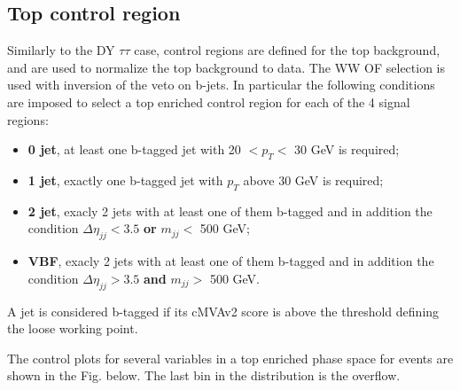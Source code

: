 \subsection{Top control region}
Similarly to the DY $\tau\tau$ case, control regions are defined for the top
background, and are used to normalize the top background to data.
The WW OF selection is used with inversion of the veto on b-jets. In
particular the following conditions are imposed to select a top enriched
control region for each of the 4 signal regions:
\begin{itemize}
\item {\bf 0 jet}, at least one b-tagged jet with 20 $< p_T <$ 30 GeV is required;
\item {\bf 1 jet}, exactly one b-tagged jet with $p_T$ above 30 GeV is required;
\item {\bf 2 jet}, exacly 2 jets with at least one of them b-tagged and in addition the condition $\Delta \eta_{jj} < 3.5$ {\bf or} $m_{jj} <$ 500 GeV;
\item {\bf VBF}, exacly 2 jets with at least one of them b-tagged and in addition the condition $\Delta \eta_{jj} > 3.5$ {\bf and} $m_{jj} >$ 500 GeV.
\end{itemize}
A jet is considered b-tagged if its cMVAv2 score is above the threshold
defining the loose working point.

The control plots for several variables in a top enriched phase space for events are shown in the Fig. below. The last bin in the distribution is the overflow.


